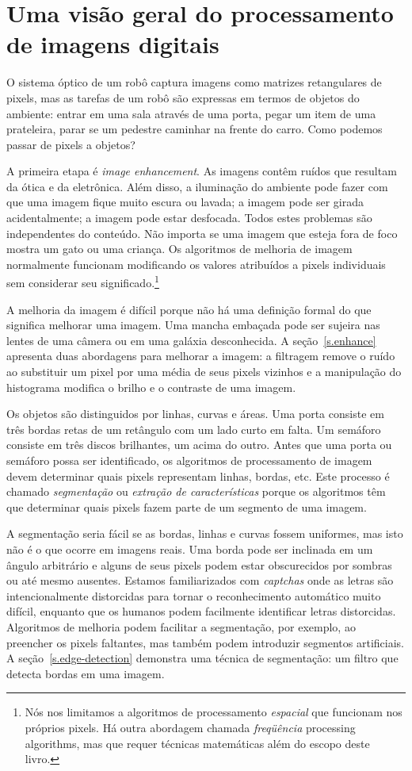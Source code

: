 \section[processamento de imagens digitais]{Uma visão geral do processamento de imagens digitais}\label{s.image-overview}

O sistema óptico de um robô captura imagens como matrizes retangulares de pixels, mas as tarefas de um robô são expressas em termos de objetos do ambiente: entrar em uma sala através de uma porta, pegar um item de uma prateleira, parar se um pedestre caminhar na frente do carro. Como podemos passar de pixels a objetos?

A primeira etapa é \emph{image enhancement}. As imagens contêm ruídos que resultam da ótica e da eletrônica. Além disso, a iluminação do ambiente pode fazer com que uma imagem fique muito escura ou lavada; a imagem pode ser girada acidentalmente; a imagem pode estar desfocada. Todos estes problemas são independentes do conteúdo. Não importa se uma imagem que esteja fora de foco mostra um gato ou uma criança. Os algoritmos de melhoria de imagem normalmente funcionam modificando os valores atribuídos a pixels individuais sem considerar seu significado.\footnote{Nós nos limitamos a algoritmos de processamento \emph{espacial} que funcionam nos próprios pixels. Há outra abordagem chamada \emph{freqüência} processing algorithms, mas que requer técnicas matemáticas além do escopo deste livro.}

A melhoria da imagem é difícil porque não há uma definição formal do que significa melhorar uma imagem. Uma mancha embaçada pode ser sujeira nas lentes de uma câmera ou em uma galáxia desconhecida. A seção~\ref{s.enhance} apresenta duas abordagens para melhorar a imagem: a filtragem remove o ruído ao substituir um pixel por uma média de seus pixels vizinhos e a manipulação do histograma modifica o brilho e o contraste de uma imagem.

Os objetos são distinguidos por linhas, curvas e áreas. Uma porta consiste em três bordas retas de um retângulo com um lado curto em falta. Um semáforo consiste em três discos brilhantes, um acima do outro. Antes que uma porta ou semáforo possa ser identificado, os algoritmos de processamento de imagem devem determinar quais pixels representam linhas, bordas, etc. Este processo é chamado \emph{segmentação} ou \emph{extração de características} porque os algoritmos têm que determinar quais pixels fazem parte de um segmento de uma imagem.

A segmentação seria fácil se as bordas, linhas e curvas fossem uniformes, mas isto não é o que ocorre em imagens reais. Uma borda pode ser inclinada em um ângulo arbitrário e alguns de seus pixels podem estar obscurecidos por sombras ou até mesmo ausentes. Estamos familiarizados com \emph{captchas} onde as letras são intencionalmente distorcidas para tornar o reconhecimento automático muito difícil, enquanto que os humanos podem facilmente identificar letras distorcidas. Algoritmos de melhoria podem facilitar a segmentação, por exemplo, ao preencher os pixels faltantes, mas também podem introduzir segmentos artificiais. A seção~\ref{s.edge-detection} demonstra uma técnica de segmentação: um filtro que detecta bordas em uma imagem.

